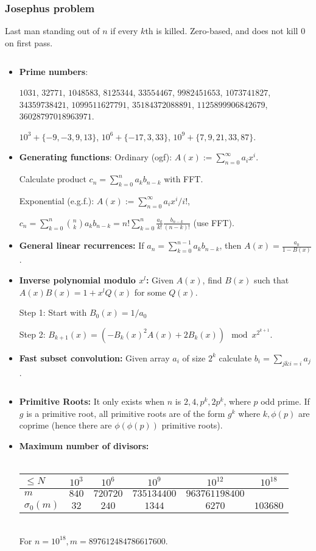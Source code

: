\documentclass[9pt,a4paper,landscape,oneside]{amsart}
\newcommand{\mintedstyle}[2]{\inputminted{#1}{code/#2}}
\newcommand{\code}[1]{\mintedstyle{cpp}{#1}}
\newcommand*\BitAnd{\mathrel{\&}}
\newenvironment{myitemize}
{\begin{itemize}[leftmargin=.3cm]
	\setlength{\itemsep}{0pt}
	\setlength{\parskip}{0pt}
	\setlength{\parsep}{0pt}     }
{ \end{itemize}                  }
\begin{document}
\begin{multicols*}{3}
\subsubsection{Josephus problem}
Last man standing out of $n$ if every $k$th is killed. Zero-based, and
does not kill $0$ on first pass.
\code{math/josephus.cpp}

\begin{myitemize}
	\item \textbf{Prime numbers}:

	$1031$, $32771$, $1048583$, $8125344$, $33554467$, $9982451653$, $1073741827$, $34359738421$, $1099511627791$, $35184372088891$, $1125899906842679$, $36028797018963971$.

	$10^3 + \{-9,-3,9,13\}$, $10^6 + \{-17,3,33\}$, $10^9+ \{7,9,21,33,87\}$.

	\item \textbf{Generating functions}:
	Ordinary (ogf): $A(x) := \sum_{n=0}^{\infty} a_i x^i$.

	Calculate product $c_n = \sum_{k=0}^{n} a_k b_{n-k}$ with FFT.

	Exponential (e.g.f.): $A(x) := \sum_{n=0}^{\infty} a_i x^i/i!$,

	$c_n = \sum_{k=0}^{n} \binom{n}{k} a_k b_{n-k} = n! \sum_{k=0}^{n} \frac{a_k}{k!} \frac{b_{n-k}}{(n-k)!}$ (use FFT).

\item \textbf{General linear recurrences:}
	If $a_n = \sum_{k=0}^{n-1} a_k b_{n-k}$, then $A(x) = \frac{a_0}{1-B(x)}$.

\item \textbf{Inverse polynomial modulo $x^l$:}
	Given $A(x)$, find $B(x)$ such that $A(x)B(x) = 1 + x^l Q(x)$ for some $Q(x)$.

	Step 1: Start with $B_0(x) = 1/a_0$

	Step 2: $B_{k+1}(x) = (-B_k(x)^2 A(x) + 2 B_k(x)) \mod x^{2^{k+1}}$.

\item \textbf{Fast subset convolution:}
	Given array $a_i$ of size $2^k$ calculate $b_i = \sum_{j \BitAnd i = i} a_j$.
	\code{math/subset_conv.cpp}

\item \textbf{Primitive Roots:}
	It only exists when $n$ is $2, 4, p^k, 2p^k$, where $p$ odd prime.
	If $g$ is a primitive root, all primitive roots are of the form $g^k$
	where $k,\phi(p)$ are coprime (hence there are $\phi(\phi(p))$ primitive roots).
	
\item \textbf{Maximum number of divisors:} \\
\\
	\begin{tabular}{|l|ccccc|}
   \hline
   $\leq N$ & $10^3$ & $10^6$ & $10^9$ & $10^{12}$ & $10^{18}$ \\
   \hline
   $m$ & $840$ & $720720$ & $735134400$ & $963761198400$ & \\
   \hline
   $\sigma_0(m)$ & $32$ & $240$ & $1344$ & $6270$ & $103680$ \\
   \hline
   \end{tabular}\\
   For $n = 10^{18}, m = 897612484786617600$.


\end{myitemize}
\end{multicols*}
\end{document}
